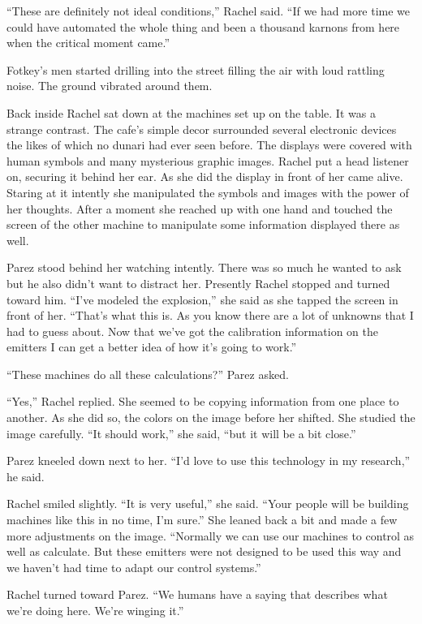 ``These are definitely not ideal conditions,'' Rachel said. ``If we had more time we could
have automated the whole thing and been a thousand karnons from here when the critical moment
came.''

Fotkey's men started drilling into the street filling the air with loud rattling noise. The
ground vibrated around them.


Back inside Rachel sat down at the machines set up on the table. It was a strange contrast. The
cafe's simple decor surrounded several electronic devices the likes of which no dunari had ever
seen before. The displays were covered with human symbols and many mysterious graphic images.
Rachel put a head listener on, securing it behind her ear. As she did the display in front of
her came alive. Staring at it intently she manipulated the symbols and images with the power of
her thoughts. After a moment she reached up with one hand and touched the screen of the other
machine to manipulate some information displayed there as well.

Parez stood behind her watching intently. There was so much he wanted to ask but he also didn't
want to distract her. Presently Rachel stopped and turned toward him. ``I've modeled the
explosion,'' she said as she tapped the screen in front of her. ``That's what this is. As you
know there are a lot of unknowns that I had to guess about. Now that we've got the calibration
information on the emitters I can get a better idea of how it's going to work.''

``These machines do all these calculations?'' Parez asked.

``Yes,'' Rachel replied. She seemed to be copying information from one place to another. As she
did so, the colors on the image before her shifted. She studied the image carefully. ``It should
work,'' she said, ``but it will be a bit close.''

Parez kneeled down next to her. ``I'd love to use this technology in my research,'' he said.

Rachel smiled slightly. ``It is very useful,'' she said. ``Your people will be building machines
like this in no time, I'm sure.'' She leaned back a bit and made a few more adjustments on the
image. ``Normally we can use our machines to control as well as calculate. But these emitters
were not designed to be used this way and we haven't had time to adapt our control systems.''

Rachel turned toward Parez. ``We humans have a saying that describes what we're doing here.
We're winging it.''

